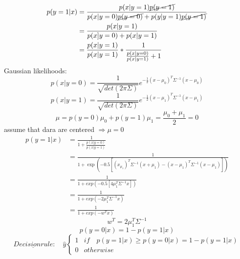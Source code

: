 \documentclass[11pt]{article}
\begin{document}
      \begin{equation*}
        \begin{align*}
          p(y=1|x) &= \frac{p(x|y=1)\cancel{p(y=1)}}{p(x|y=0)\cancel{p(y=0)} + p(y|y=1)\cancel{p(y=1)}} \\
          &= \frac{p(x|y=1)}{p(x]y=0) + p(x|y=1)} \\
          &= \frac{p(x|y=1)}{p(x|y=1)} * \frac{1}{\frac{p(x|y=0)}{p(x|y=1)} + 1}
        \end{align*}
      \end{equation*}
      Gaussian likelihoods:
      \begin{equation*}
        p(x|y=0) = \frac{1}{\sqrt{det(2\pi\Sigma)}} e^{-\frac{1}{2}(x-\mu_{0})^T\Sigma^{-1}(x - \mu_{0})}
      \end{equation*}
      \begin{equation*}
        p(x|y=1) = \frac{1}{\sqrt{det(2\pi\Sigma)}} e^{-\frac{1}{2}(x-\mu_{1})^T\Sigma^{-1}(x - \mu_{1})}
      \end{equation*}
      \begin{equation*}
        \mu = p(y=0)\mu_{0} + p(y=1)\mu_{1} = \frac{\mu_{0} + \mu_{1}}{2} = 0
      \end{equation*}
      assume that dara are centered $\Rightarrow \mu = 0$
      \begin{equation*}
        \begin{align*}
        p(y=1|x) &= \frac{1}{1 + \frac{p(x|y=0)}{p(x|y=1)}} \\
        &= \frac{1}{1 +\exp(-0.5[(x_\mu_{1})^T\Sigma^{-1}(x+
        \mu_{1})- (x-\mu_{1})^T\Sigma^{-1}(x-\mu_{1})])} \\
        &= \frac{1}{1 + exp(-0.5[4\mu_{1}^T\Sigma^{-1}x])} \\
        &= \frac{1}{1 + exp(-2\mu_{1}^T\Sigma^{-1}x)} \\
        &= \frac{1}{1 + exp(-w^Tx)}
        \end{align*}
      \end{equation*}
      \begin{equation*}
        w^T = 2\mu_{1}^T\Sigma^{-1}
      \end{equation*}
      \begin{equation*}
        p(y=0|x) = 1 - p(y=1|x)
      \end{equation*}
      \begin{equation*}
        \underline{Decision rule}: \quad \hat{y} \begin{cases}
        1 & if \quad p(y=1|x) \geq p(y=0|x) = 1-p(y=1|x) \\
        0 & otherwise
        \end{cases}
      \end{equation*}
\end{document}
